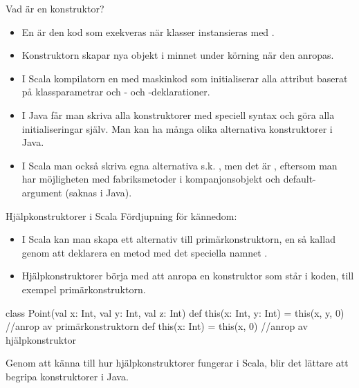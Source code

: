 \begin{Slide}{Vad är en konstruktor?}
\begin{itemize}
\item En  är den kod som exekveras när klasser instansieras med .

\item Konstruktorn skapar nya objekt i minnet under körning när den anropas.

\item I Scala  kompilatorn en  med maskinkod som initialiserar alla attribut baserat på klassparametrar och - och -deklarationer.

\pause

\item I Java får man  skriva alla konstruktorer med speciell syntax och göra alla initialiseringar själv. Man kan ha många olika alternativa konstruktorer i Java.

\item I Scala  man också skriva egna alternativa s.k. , men det är , eftersom man har möjligheten med fabriksmetoder i kompanjonsobjekt och default-argument (saknas i Java).
\end{itemize}
\end{Slide}


\begin{Slide}{Hjälpkonstruktorer i Scala}%
Fördjupning för kännedom:
\begin{itemize}
\item I Scala kan man skapa ett alternativ till primärkonstruktorn, en så kallad   genom att deklarera en metod med det speciella namnet .


\item Hjälpkonstruktorer  börja med att anropa en  konstruktor som står  i koden, till exempel primärkonstruktorn.
\end{itemize}

\begin{Code}
class Point(val x: Int, val y: Int, val z: Int){
  def this(x: Int, y: Int) = this(x, y, 0)   //anrop av primärkonstruktorn
  def this(x: Int) = this(x, 0)              //anrop av hjälpkonstruktor
}
\end{Code}

{\SlideFontSmall Genom att känna till hur hjälpkonstruktorer fungerar i Scala, blir det lättare att begripa konstruktorer i Java.}

\end{Slide}

